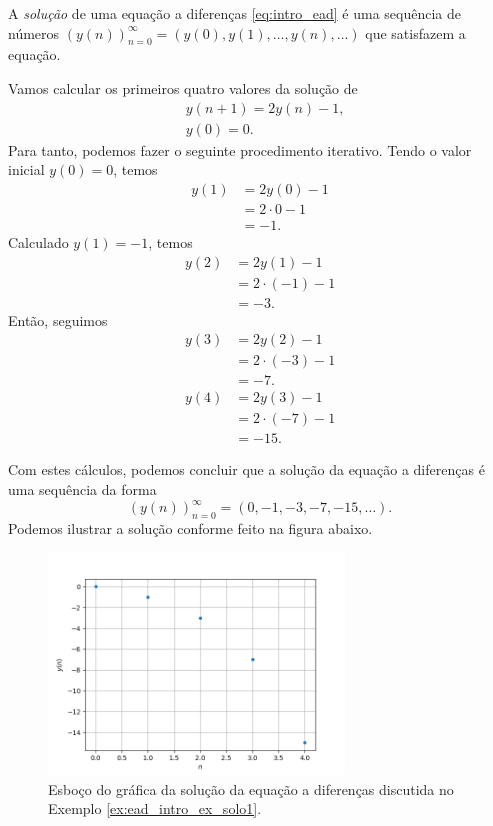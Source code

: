 A \emph{solução} de uma equação a diferenças \eqref{eq:intro_ead} é uma sequência de números $\left(y(n)\right)_{n=0}^\infty = \left(y(0), y(1), \dotsc, y(n), \ldots\right)$ que satisfazem a equação.

\begin{ex}\label{ex:ead_intro_ex_solo1}
  Vamos calcular os primeiros quatro valores da solução de
  \begin{align}
    &y(n+1) = 2y(n) - 1,\\
    &y(0)=0.
  \end{align}
  Para tanto, podemos fazer o seguinte procedimento iterativo. Tendo o valor inicial $y(0)=0$, temos
  \begin{align}
    y(1) &= 2y(0) - 1\\
         &= 2\cdot 0 - 1\\
         &= -1.
  \end{align}
  Calculado $y(1)=-1$, temos
  \begin{align}
    y(2) &= 2y(1) - 1\\
         &= 2\cdot (-1) - 1\\
         &= -3.
  \end{align}
  Então, seguimos
  \begin{align}
    y(3) &= 2y(2) - 1\\
         &= 2\cdot (-3) - 1\\
         &= -7.\\
    y(4) &= 2y(3) - 1\\
         &= 2\cdot (-7) - 1\\
         &= -15.
  \end{align}

  Com estes cálculos, podemos concluir que a solução da equação a diferenças é uma sequência da forma
  \begin{equation}
    (y(n))_{n=0}^\infty = (0, -1, -3, -7, -15, \ldots).
  \end{equation}
  Podemos ilustrar a solução conforme feito na figura abaixo.

  \begin{figure}[H]
    \centering
    \includegraphics[width=0.7\textwidth]{cap_intro/dados/fig_ead1_intro_ex_solo1/fig.png}
    \caption{Esboço do gráfica da solução da equação a diferenças discutida no Exemplo \ref{ex:ead_intro_ex_solo1}.}
    \label{fig:ead1_intro_ex_solo1}
  \end{figure}
\end{ex}

